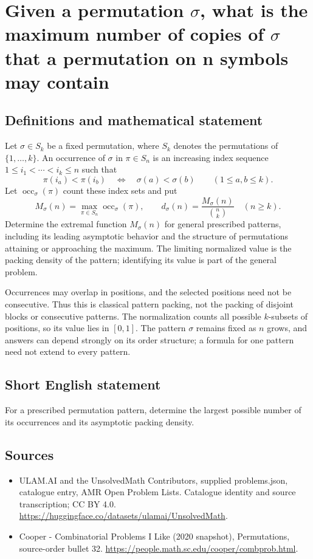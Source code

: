 \documentclass[11pt,a4paper]{article}
\begin{document}
\section*{Given a permutation $\sigma$, what is the maximum number of copies of $\sigma$ that a permutation on n symbols may contain}\label{statement}

\subsection{Definitions and mathematical statement}
Let $\sigma\in S_k$ be a fixed permutation, where $S_k$ denotes
the permutations of $\{1,\ldots,k\}$. An occurrence of $\sigma$
in $\pi\in S_n$ is an increasing index sequence
$1\le i_1<\cdots<i_k\le n$ such that
\[
          \pi(i_a)<\pi(i_b)\quad\Longleftrightarrow\quad
                      \sigma(a)<\sigma(b)
                 \qquad(1\le a,b\le k).
\]
Let $\operatorname{occ}_\sigma(\pi)$ count these index sets and put
\[
 M_\sigma(n)=\max_{\pi\in S_n}\operatorname{occ}_\sigma(\pi),
 \qquad d_\sigma(n)=\frac{M_\sigma(n)}{\binom nk}
                         \quad(n\ge k).
\]
Determine the extremal function $M_\sigma(n)$ for general prescribed
patterns, including its leading asymptotic behavior and the
structure of permutations attaining or approaching the maximum.
The limiting normalized value is the packing density of the
pattern; identifying its value is part of the general problem.

Occurrences may overlap in positions, and the selected positions
need not be consecutive. Thus this is classical pattern packing,
not the packing of disjoint blocks or consecutive patterns.
The normalization counts all possible $k$-subsets of positions,
so its value lies in $[0,1]$. The pattern $\sigma$ remains fixed as
$n$ grows, and answers can depend strongly on its order structure;
a formula for one pattern need not extend to every pattern.
\subsection{Short English statement}
For a prescribed permutation pattern, determine the largest possible number of its occurrences and its asymptotic packing density.
\subsection{Sources}
\begin{itemize}
\item[S1] ULAM.AI and the UnsolvedMath Contributors, supplied problems.json, catalogue entry, AMR Open Problem Lists. Catalogue identity and source transcription; CC BY 4.0.
\url{https://huggingface.co/datasets/ulamai/UnsolvedMath}.
\item[S2] Cooper - Combinatorial Problems I Like (2020 snapshot), Permutations, source-order bullet 32. 
\url{https://people.math.sc.edu/cooper/combprob.html}.
\end{itemize}
\end{document}
